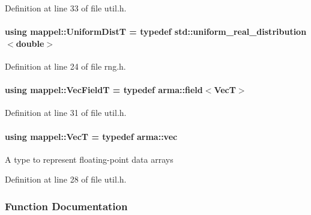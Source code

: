 Definition at line 33 of file util.\+h.

\paragraph[{\texorpdfstring{Uniform\+DistT}{UniformDistT}}]{\setlength{\rightskip}{0pt plus 5cm}using {\bf mappel\+::\+Uniform\+DistT} = typedef std\+::uniform\+\_\+real\+\_\+distribution$<$double$>$}\hypertarget{namespacemappel_ac559959896fbdf3a8ce294353ea41aff}{}\label{namespacemappel_ac559959896fbdf3a8ce294353ea41aff}


Definition at line 24 of file rng.\+h.

\paragraph[{\texorpdfstring{Vec\+FieldT}{VecFieldT}}]{\setlength{\rightskip}{0pt plus 5cm}using {\bf mappel\+::\+Vec\+FieldT} = typedef arma\+::field$<${\bf VecT}$>$}\hypertarget{namespacemappel_a834ec4f32487f07c0ca1e22d4928d1f8}{}\label{namespacemappel_a834ec4f32487f07c0ca1e22d4928d1f8}


Definition at line 31 of file util.\+h.

\paragraph[{\texorpdfstring{VecT}{VecT}}]{\setlength{\rightskip}{0pt plus 5cm}using {\bf mappel\+::\+VecT} = typedef arma\+::vec}\hypertarget{namespacemappel_a2225ad69f358daa3f4f99282a35b9a3a}{}\label{namespacemappel_a2225ad69f358daa3f4f99282a35b9a3a}
A type to represent floating-\/point data arrays 

Definition at line 28 of file util.\+h.



\subsubsection{Function Documentation}
